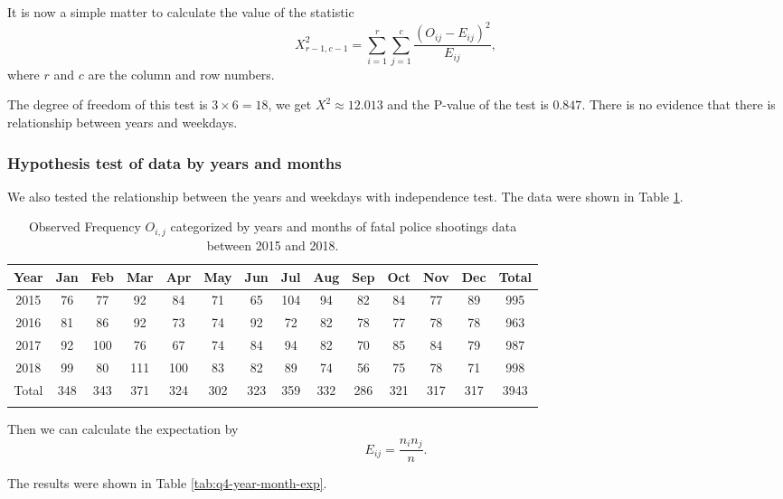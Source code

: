 \documentclass[conf]{new-aiaa}
\begin{document}
It is now a simple matter to calculate the value of the statistic
$$X^2_{r-1,c-1}=\sum_{i=1}^r\sum_{j=1}^c\frac{(O_{ij}-E_{ij})^2}{E_{ij}},$$
where $r$ and $c$ are the column and row numbers. \medskip

The degree of freedom of this test is $3\times6=18$, we get $X^2\approx12.013$ and the P-value of the test is $0.847$. There is no evidence that there is relationship between years and weekdays. 

\subsubsection{Hypothesis test of data by years and months}

We also tested the relationship between the years and weekdays with independence test. The data were shown in Table \ref{tab:q4-year-month-obs}.

\begin{table}[!htbp]
\centering
\begin{tabular}{c|cccccccccccc|c}
\toprule 
\toprule
Year & Jan & Feb & Mar & Apr & May & Jun & Jul & Aug & Sep & Oct & Nov & Dec & Total \\
\hline
2015 & 76 & 77 & 92 & 84 & 71 & 65 & 104 & 94 & 82 & 84 & 77 & 89 & 995\\
2016 & 81 & 86 & 92 & 73 & 74 & 92 & 72 & 82 & 78 & 77 & 78 & 78 & 963\\
2017 & 92 & 100 & 76 & 67 & 74 & 84 & 94 & 82 & 70 & 85 & 84 & 79 & 987\\
2018 & 99 & 80 & 111 & 100 & 83 & 82 & 89 & 74 & 56 & 75 & 78 & 71 & 998\\
\hline
Total & 348 & 343 & 371 & 324 & 302 & 323 & 359 & 332 & 286 & 321 & 317 & 317 & 3943\\
\bottomrule 
\bottomrule\noalign{\bigskip}
\end{tabular}
\caption{Observed Frequency $O_{i,j}$ categorized by years and months of fatal police shootings data between 2015 and 2018.}
\label{tab:q4-year-month-obs}
\end{table}

Then we can calculate the expectation by
$$E_{ij}=\frac{n_in_j}{n}.$$

The results were shown in Table \ref{tab:q4-year-month-exp}.
\end{document}
